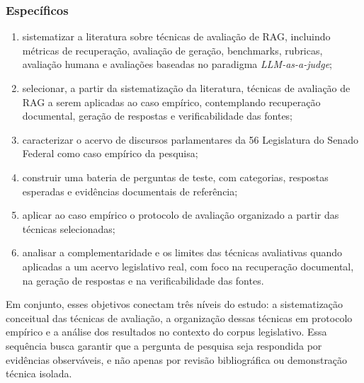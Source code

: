 \subsubsection{Específicos}

\begin{enumerate}
  \item sistematizar a literatura sobre técnicas de avaliação de RAG, incluindo métricas de recuperação, avaliação de geração, benchmarks, rubricas, avaliação humana e avaliações baseadas no paradigma \textit{LLM-as-a-judge};
  \item selecionar, a partir da sistematização da literatura, técnicas de avaliação de RAG a serem aplicadas ao caso empírico, contemplando recuperação documental, geração de respostas e verificabilidade das fontes;
  \item caracterizar o acervo de discursos parlamentares da 56\textordfeminine{} Legislatura do Senado Federal como caso empírico da pesquisa;
  \item construir uma bateria de perguntas de teste, com categorias, respostas esperadas e evidências documentais de referência;
  \item aplicar ao caso empírico o protocolo de avaliação organizado a partir das técnicas selecionadas;
  \item analisar a complementaridade e os limites das técnicas avaliativas quando aplicadas a um acervo legislativo real, com foco na recuperação documental, na geração de respostas e na verificabilidade das fontes.
\end{enumerate}

Em conjunto, esses objetivos conectam três níveis do estudo: a sistematização conceitual das técnicas de avaliação, a organização dessas técnicas em protocolo empírico e a análise dos resultados no contexto do corpus legislativo. Essa sequência busca garantir que a pergunta de pesquisa seja respondida por evidências observáveis, e não apenas por revisão bibliográfica ou demonstração técnica isolada.
